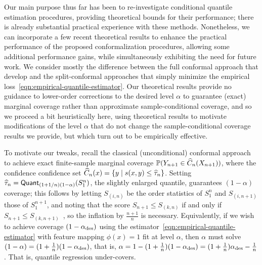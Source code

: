 \documentclass[11pt]{article}
\newcommand{\scorefunc}{s}
\newcommand{\scoreval}{\scorefunc}
\newcommand{\scorerv}{S}
\newcommand{\quant}{\mathsf{Quant}}
\begin{document}
Our main purpose thus far has been to re-investigate conditional quantile
estimation procedures, providing theoretical bounds for their performance;
there is already substantial practical experience with these methods.
%
Nonetheless, we can incorporate a few recent theoretical results to enhance
the practical performance of the proposed conformalization procedures,
allowing some additional performance gains, while simultaneously
exhibiting the need for future work.
%
We consider mostly the difference between the full conformal approach that
\citet{GibbsChCa23} develop and the split-conformal approaches
that simply minimize the empirical
loss~\eqref{eqn:empirical-quantile-estimator}.
%
Our theoretical results provide no guidance to lower-order corrections
to the desired level $\alpha$ to guarantee (exact) marginal coverage
rather than approximate sample-conditional coverage, and
so we proceed a bit heuristically here, using theoretical
results to motivate modifications of the level $\alpha$ that
do not change the sample-conditional coverage results we provide, but
which turn out to be empirically effective.

\newcommand{\alphadesired}{\alpha_{\textup{des}}}

To motivate our tweaks, recall the classical (unconditional) conformal
approach to achieve exact finite-sample marginal coverage $\mathbb{P}(Y_{n + 1} \in
\widehat{C}_n(X_{n + 1}))$, where the confidence confidence set $\what{C}_n(x)
= \{y \mid \scoreval(x, y) \le \what{\tau}_n\}$.
%
Setting $\what{\tau}_n = \quant_{(1 + 1/n) (1 - \alpha)}(\scorerv_1^n)$, the
slightly enlarged quantile, guarantees $(1 - \alpha)$ coverage; this follows
by letting $\scorerv_{(i,n)}$ be the order statistics of $\scorerv_1^n$ and
$\scorerv_{(i, n + 1)}$ those of $\scorerv_1^{n + 1}$, and noting that the
score $\scorerv_{n + 1} \le \scorerv_{(k,n)}$ if and only if $\scorerv_{n +
  1} \le \scorerv_{(k , n + 1)}$~\cite[Lemma 2]{RomanoPaCa19}, so the
inflation by $\frac{n+1}{n}$ is necessary.
%
Equivalently, if we wish to achieve coverage $(1 - \alphadesired)$ using the
estimator~\eqref{eqn:empirical-quantile-estimator} with feature mapping
$\phi(x) = 1$ fit at level $\alpha$, then $\alpha$ must solve $(1 - \alpha)
= (1 + \frac{1}{n}) (1 - \alphadesired)$, that is, $\alpha = 1 - (1 +
\frac{1}{n})(1 - \alphadesired) = (1 + \frac{1}{n}) \alphadesired -
\frac{1}{n}$.
%
That is, quantile regression under-covers.
\end{document}
